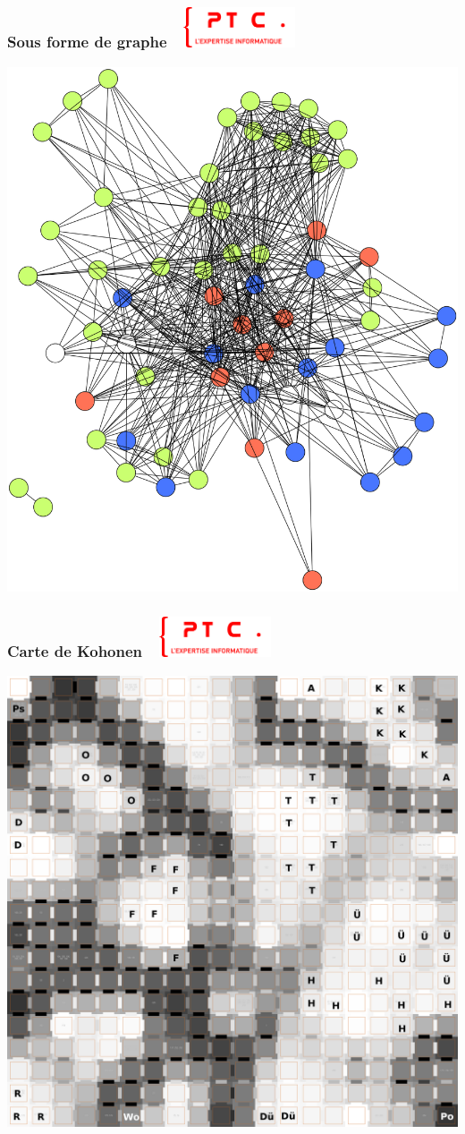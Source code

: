 \documentclass[11pt]{beamer}
\newenvironment{slide}[1]{%
\begin{frame}[environment=slide]
\frametitle{#1~\hfill~\includegraphics[height=1.2cm]{./epitech.png}}
}{%
\end{frame}
}
\begin{document}
\begin{slide}{Sous forme de graphe}
\begin{center}
\includegraphics[scale=0.15,angle=270]{HL_places_graph.png}
\end{center}
\end{slide}

\begin{slide}{Carte de Kohonen}
\begin{center}
\includegraphics[scale=0.07]{HL_Kohonen.png}
\end{center}
\end{slide}
\end{document}
